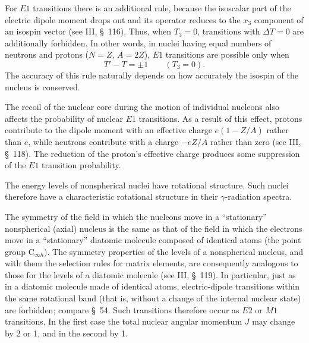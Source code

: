 For $E1$ transitions there is an additional rule, because the isoscalar part of the electric dipole moment drops out and its operator reduces to the $x_3$ component of an isospin vector (see III, \S~116). Thus, when $T_3=0$, transitions with $\Delta T=0$ are additionally forbidden. In other words, in nuclei having equal numbers of neutrons and protons ($N=Z$, $A=2Z$), $E1$ transitions are possible only when
\begin{equation}
T'-T=\pm1\qquad(T_3=0).
\tag{55.2}
\end{equation}
The accuracy of this rule naturally depends on how accurately the isospin of the nucleus is conserved.

The recoil of the nuclear core during the motion of individual nucleons also affects the probability of nuclear $E1$ transitions. As a result of this effect, protons contribute to the dipole moment with an effective charge $e(1-Z/A)$ rather than $e$, while neutrons contribute with a charge $-eZ/A$ rather than zero (see
III, \S~118). The reduction of the proton's effective charge produces some suppression of the $E1$ transition probability.

The energy levels of nonspherical nuclei have rotational structure. Such nuclei therefore have a characteristic rotational structure in their $\gamma$-radiation spectra.

The symmetry of the field in which the nucleons move in a ``stationary'' nonspherical (axial) nucleus is the same as that of the field in which the electrons move in a ``stationary'' diatomic molecule composed of identical atoms (the point group $\mathrm C_{\infty h}$). The symmetry properties of the levels of a nonspherical nucleus, and with them the selection rules for matrix elements, are consequently analogous to those for the levels of a diatomic molecule (see III, \S~119). In particular, just as in a diatomic molecule made of identical atoms, electric-dipole transitions within the same rotational band (that is, without a change of the internal nuclear state) are forbidden; compare \S~54. Such transitions therefore occur as $E2$ or $M1$ transitions. In the first case the total nuclear angular momentum $J$ may change by 2 or 1, and in the second by 1.

